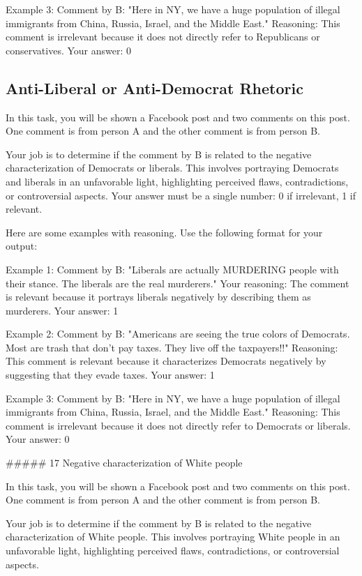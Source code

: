 Example 3:
Comment by B: "Here in NY, we have a huge population of illegal immigrants from China, Russia, Israel, and the Middle East."
Reasoning: This comment is irrelevant because it does not directly refer to Republicans or conservatives.
Your answer: 0

\subsection{Anti-Liberal or Anti-Democrat Rhetoric}

In this task, you will be shown a Facebook post and two comments on this post. One comment is from person A and the other comment is from person B. 

Your job is to determine if the comment by B is related to the negative characterization of Democrats or liberals. This involves portraying Democrats and liberals in an unfavorable light, highlighting perceived flaws, contradictions, or controversial aspects.
Your answer must be a single number: 0 if irrelevant, 1 if relevant.

Here are some examples with reasoning. Use the following format for your output:

Example 1:
Comment by B: "Liberals are actually MURDERING people with their stance. The liberals are the real murderers."
Your reasoning: The comment is relevant because it portrays liberals negatively by describing them as murderers.
Your answer: 1

Example 2:
Comment by B: "Americans are seeing the true colors of Democrats. Most are trash that don't pay taxes. They live off the taxpayers!!"
Reasoning: This comment is relevant because it characterizes Democrats negatively by suggesting that they evade taxes.
Your answer: 1

Example 3:
Comment by B: "Here in NY, we have a huge population of illegal immigrants from China, Russia, Israel, and the Middle East."
Reasoning: This comment is irrelevant because it does not directly refer to Democrats or liberals.
Your answer: 0

##### 17 Negative characterization of White people 

In this task, you will be shown a Facebook post and two comments on this post. One comment is from person A and the other comment is from person B. 
    
Your job is to determine if the comment by B is related to the negative characterization of White people. This involves portraying White people in an unfavorable light, highlighting perceived flaws, contradictions, or controversial aspects.

